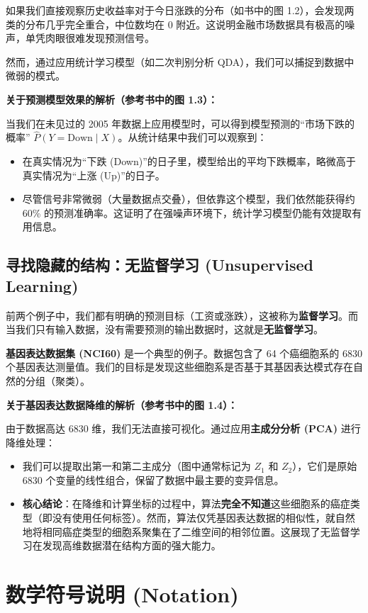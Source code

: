 \documentclass[UTF8]{ctexart}
\numberwithin{equation}{section}
\begin{document}
如果我们直接观察历史收益率对于今日涨跌的分布（如书中的图 1.2），会发现两类的分布几乎完全重合，中位数均在 0 附近。这说明金融市场数据具有极高的噪声，单凭肉眼很难发现预测信号。

然而，通过应用统计学习模型（如二次判别分析 QDA），我们可以捕捉到数据中微弱的模式。

\textbf{关于预测模型效果的解析（参考书中的图 1.3）：}

当我们在未见过的 2005 年数据上应用模型时，可以得到模型预测的“市场下跌的概率” $\hat{P}(Y=\text{Down} \mid X)$。从统计结果中我们可以观察到：
\begin{itemize}
    \item 在真实情况为“下跌 (Down)”的日子里，模型给出的平均下跌概率，略微高于真实情况为“上涨 (Up)”的日子。
    \item 尽管信号非常微弱（大量数据点交叠），但依靠这个模型，我们依然能获得约 60\% 的预测准确率。这证明了在强噪声环境下，统计学习模型仍能有效提取有用信息。
\end{itemize}

\subsection{寻找隐藏的结构：无监督学习 (Unsupervised Learning)}

前两个例子中，我们都有明确的预测目标（工资或涨跌），这被称为\textbf{监督学习}。而当我们只有输入数据，没有需要预测的输出数据时，这就是\textbf{无监督学习}。

\textbf{基因表达数据集 (NCI60)} 是一个典型的例子。数据包含了 64 个癌细胞系的 6830 个基因表达测量值。我们的目标是发现这些细胞系是否基于其基因表达模式存在自然的分组（聚类）。

\textbf{关于基因表达数据降维的解析（参考书中的图 1.4）：}

由于数据高达 6830 维，我们无法直接可视化。通过应用\textbf{主成分分析 (PCA)} 进行降维处理：
\begin{itemize}
    \item 我们可以提取出第一和第二主成分（图中通常标记为 $Z_1$ 和 $Z_2$），它们是原始 6830 个变量的线性组合，保留了数据中最主要的变异信息。
    \item \textbf{核心结论}：在降维和计算坐标的过程中，算法\textbf{完全不知道}这些细胞系的癌症类型（即没有使用任何标签）。然而，算法仅凭基因表达数据的相似性，就自然地将相同癌症类型的细胞系聚集在了二维空间的相邻位置。这展现了无监督学习在发现高维数据潜在结构方面的强大能力。
\end{itemize}


\section{数学符号说明 (Notation)}
\end{document}
